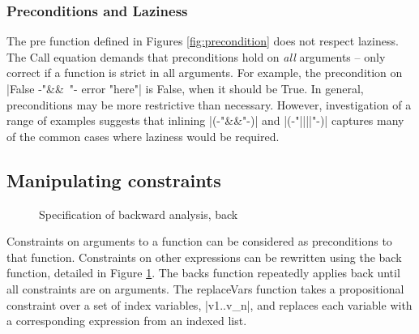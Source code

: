 \documentclass[preprint]{sigplanconf}
\newcommand{\C}[1]{\textsf{#1}}
\begin{document}
\subsubsection{Preconditions and Laziness}

The \C{pre} function defined in Figures \ref{fig:precondition} does not respect laziness. The \C{Call} equation demands that preconditions hold on \textit{all} arguments -- only correct if a function is strict in all arguments. For example, the precondition on |False {-"\hbox{\textsf{\&\&} }"-} error "here"| is False, when it should be True. In general, preconditions may be more restrictive than necessary. However, investigation of a range of examples suggests that inlining |({-"\hbox{\textsf{\&\&}}"-})| and |({-"||||"-})| captures many of the common cases where laziness would be required.


\subsection{Manipulating constraints}
\label{sec:backward}

\begin{figure}
\caption{Specification of backward analysis, \C{back}}
\label{fig:backward}
\end{figure}

Constraints on arguments to a function can be considered as preconditions to that function. Constraints on other expressions can be rewritten using the \C{back} function, detailed in Figure \ref{fig:backward}. The \C{backs} function repeatedly applies \C{back} until all constraints are on arguments. The \C{replaceVars} function takes a propositional constraint over a set of index variables, |v1..v_n|, and replaces each variable with a corresponding expression from an indexed list.
\end{document}
